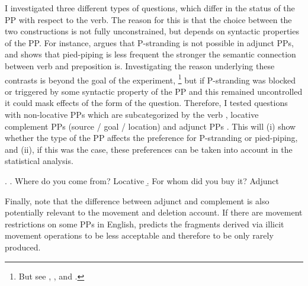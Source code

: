 I investigated three different types of questions, which differ in the status of the PP with respect to the verb. The reason for this is that the choice between the two constructions is not fully unconstrained, but depends on syntactic properties of the PP. For instance, \citet[26]{vanriemsdijk1978} argues that P-stranding is not possible in adjunct PPs, and \citet{nykiel2017} shows that pied-piping is less frequent the stronger the semantic connection between verb and preposition is. Investigating the reason underlying these contrasts is beyond the goal of the experiment,%
% 
\footnote{But see \citet{vanriemsdijk1978}, \citet{chomsky1981}, \citet{pullum.huddleston2002} and \citet{nykiel2017}.}\afterfn%
%
but if P-stranding was blocked or triggered by some syntactic property of the PP and this remained uncontrolled it could mask effects of the form of the question. Therefore, I tested questions with non-locative PPs which are subcategorized by the verb \LLast, locative complement PPs (source / goal / location) \Next[a] and adjunct PPs \Next[b]. This will (i) show whether the type of the PP affects the preference for P-stranding or pied-piping, and (ii), if this was the case, these preferences can be taken into account in the statistical analysis.

\ex. \a. Where do you come from? \hfill Locative
     \b. For whom did you buy it? \hfill Adjunct

Finally, note that the difference between adjunct and complement is also potentially relevant to the movement and deletion account. If there are movement restrictions on some PPs in English, \citet{merchant2004} predicts the fragments derived via illicit movement operations to be less acceptable and therefore to be only rarely produced.

